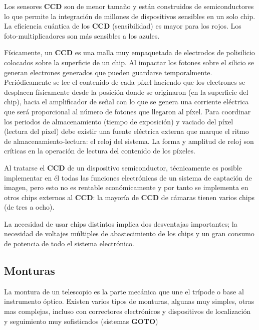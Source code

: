 \bigskip
Los sensores \textbf{CCD} son de menor tamaño y están construidos de semiconductores lo que permite la integración de millones de dispositivos sensibles en un solo chip.
La eficiencia cuántica de los \textbf{CCD} (sensibilidad) es mayor para los rojos. Los foto-multiplicadores son más sensibles a los azules.

\bigskip
Físicamente, un \textbf{CCD} es una malla muy empaquetada de electrodos de polisilicio colocados sobre la superficie de un chip. Al impactar los fotones sobre el silicio se generan electrones generados que pueden guardarse temporalmente. Periódicamente se lee el contenido de cada píxel haciendo que los electrones se desplacen físicamente desde la posición donde se originaron (en la superficie del chip), hacia el amplificador de señal con lo que se genera una corriente eléctrica que será proporcional al número de fotones que llegaron al píxel. Para coordinar los periodos de almacenamiento (tiempo de exposición) y vaciado del píxel (lectura del píxel) debe existir una fuente eléctrica externa que marque el ritmo de almacenamiento-lectura: el reloj del sistema. La forma y amplitud de reloj son críticas en la operación de lectura del contenido de los píxeles.

\bigskip
Al tratarse el \textbf{CCD} de un dispositivo semiconductor, técnicamente es posible implementar en él todas las funciones electrónicas de un sistema de captación de imagen, pero esto no es rentable económicamente y por tanto se implementa en otros chips externos al \textbf{CCD}: la mayoría de \textbf{CCD} de cámaras tienen varios chips (de tres a ocho).

\bigskip
La necesidad de usar chips distintos implica dos desventajas importantes; la necesidad de voltajes múltiples de abastecimiento de los chips y un gran consumo de potencia de todo el sistema electrónico.

\subsection{Monturas}

La montura de un telescopio es la parte mecánica que une el trípode o base al instrumento óptico. Existen varios tipos de monturas, algunas muy simples, otras mas complejas, incluso con correctores electrónicos y dispositivos de localización y seguimiento muy sofisticados (sistemas \textbf{GOTO})


